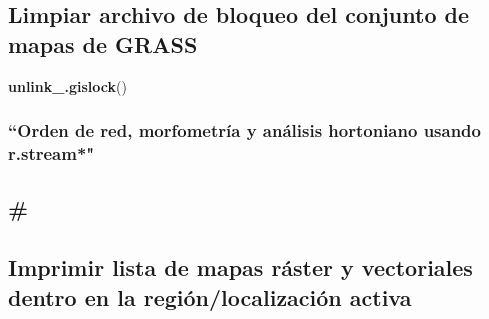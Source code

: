 \documentclass[11pt,]{article}
\newenvironment{Shaded}{\begin{snugshade}}{\end{snugshade}}
\newcommand{\KeywordTok}[1]{\textcolor[rgb]{0.13,0.29,0.53}{\textbf{#1}}}
\newcommand{\DataTypeTok}[1]{\textcolor[rgb]{0.13,0.29,0.53}{#1}}
\newcommand{\StringTok}[1]{\textcolor[rgb]{0.31,0.60,0.02}{#1}}
\newcommand{\OtherTok}[1]{\textcolor[rgb]{0.56,0.35,0.01}{#1}}
\newcommand{\OperatorTok}[1]{\textcolor[rgb]{0.81,0.36,0.00}{\textbf{#1}}}
\newcommand{\NormalTok}[1]{#1}
\begin{document}
\subsection{Limpiar archivo de bloqueo del conjunto de mapas de
GRASS}\label{limpiar-archivo-de-bloqueo-del-conjunto-de-mapas-de-grass}

\begin{Shaded}
\begin{Highlighting}[]
\KeywordTok{unlink_.gislock}\NormalTok{()}
\end{Highlighting}
\end{Shaded}

\subsubsection{``Orden de red, morfometría y análisis hortoniano usando
r.stream*"}\label{orden-de-red-morfometruxeda-y-anuxe1lisis-hortoniano-usando-r.stream}

\begin{Shaded}
\end{Shaded}

\subsection{\#}\label{section}

\begin{Shaded}
\end{Shaded}

\subsection{Imprimir lista de mapas ráster y vectoriales dentro en la
región/localización
activa}\label{imprimir-lista-de-mapas-ruxe1ster-y-vectoriales-dentro-en-la-regiuxf3nlocalizaciuxf3n-activa}
\end{document}
